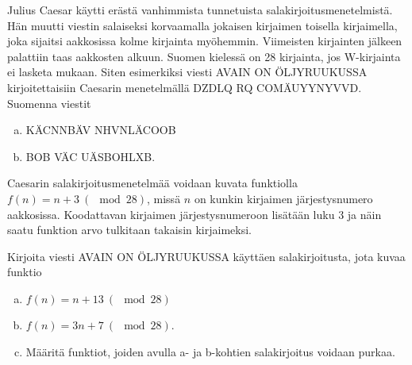 \begin{tehtavasivu}
\begin{tehtava}
	Julius Caesar käytti erästä vanhimmista tunnetuista salakirjoitusmenetelmistä. Hän muutti viestin salaiseksi korvaamalla jokaisen kirjaimen toisella kirjaimella, joka sijaitsi aakkosissa kolme kirjainta myöhemmin. Viimeisten kirjainten jälkeen palattiin taas aakkosten alkuun. Suomen kielessä on 28 kirjainta, jos W-kirjainta ei lasketa mukaan. Siten esimerkiksi viesti AVAIN ON ÖLJYRUUKUSSA kirjoitettaisiin Caesarin menetelmällä DZDLQ RQ COMÄUYYNYVVD. Suomenna viestit 
	\begin{enumerate}[a)]
	\item KÄCNNBÄV NHVNLÄCOOB
	\item BOB VÄC UÄSBOHLXB.
	\end{enumerate}
\end{tehtava}

\begin{tehtava}
	Caesarin salakirjoitusmenetelmää voidaan kuvata funktiolla $f(n) = n + 3 \ (\mod 28)$, missä $n$ on kunkin kirjaimen järjestysnumero aakkosissa. Koodattavan kirjaimen järjestysnumeroon lisätään luku $3$ ja näin saatu funktion arvo tulkitaan takaisin kirjaimeksi.

	Kirjoita viesti AVAIN ON ÖLJYRUUKUSSA käyttäen salakirjoitusta, jota kuvaa funktio 
	\begin{enumerate}[a)]
	\item $f(n) = n + 13 \ (\mod 28)$
	\item $f(n) = 3n + 7 \ (\mod 28)$.
	\item Määritä funktiot, joiden avulla a- ja b-kohtien salakirjoitus voidaan purkaa.
	\end{enumerate}
\end{tehtava}

\end{tehtavasivu}

\setcounter{tehtava}{0}

